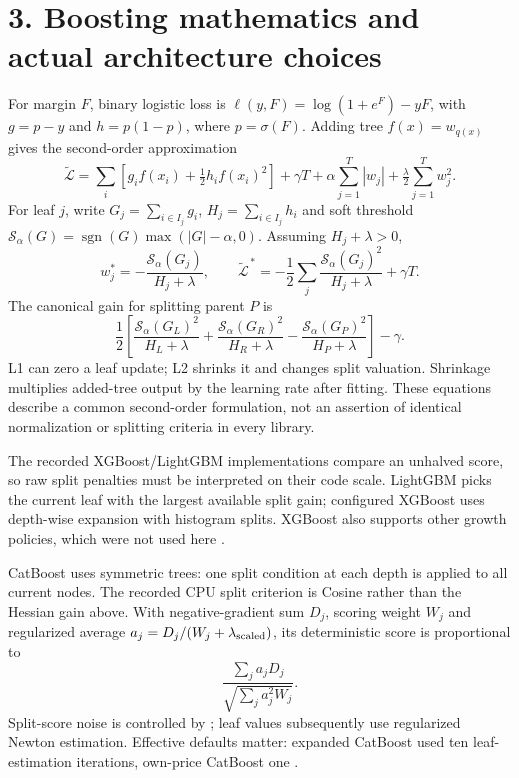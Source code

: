 \documentclass[11pt,a4paper]{article}
\begin{document}
\section*{3. Boosting mathematics and actual architecture choices}
For margin $F$, binary logistic loss is $\ell(y,F)=\log(1+e^F)-yF$, with $g=p-y$ and $h=p(1-p)$, where $p=\sigma(F)$. Adding tree $f(x)=w_{q(x)}$ gives the second-order approximation
\[
\widetilde{\mathcal L}=\sum_i[g_i f(x_i)+\tfrac12h_i f(x_i)^2]
+\gamma T+\alpha\sum_{j=1}^T|w_j|+\tfrac\lambda2\sum_{j=1}^T w_j^2.
\]
For leaf $j$, write $G_j=\sum_{i\in I_j}g_i$, $H_j=\sum_{i\in I_j}h_i$ and soft threshold $\mathcal S_\alpha(G)=\operatorname{sgn}(G)\max(|G|-\alpha,0)$. Assuming $H_j+\lambda>0$,
\[
w_j^*=-\frac{\mathcal S_\alpha(G_j)}{H_j+\lambda},\qquad
\widetilde{\mathcal L}^{\,*}=-\frac12\sum_j
\frac{\mathcal S_\alpha(G_j)^2}{H_j+\lambda}+\gamma T.
\]
The canonical gain for splitting parent $P$ is
\[
\frac12\left[
\frac{\mathcal S_\alpha(G_L)^2}{H_L+\lambda}
+\frac{\mathcal S_\alpha(G_R)^2}{H_R+\lambda}
-\frac{\mathcal S_\alpha(G_P)^2}{H_P+\lambda}\right]-\gamma.
\]
L1 can zero a leaf update; L2 shrinks it and changes split valuation. Shrinkage multiplies added-tree output by the learning rate after fitting. These equations describe a common second-order formulation, not an assertion of identical normalization or splitting criteria in every library.

The recorded XGBoost/LightGBM implementations compare an unhalved score, so raw split penalties must be interpreted on their code scale. LightGBM picks the current leaf with the largest available split gain; configured XGBoost uses depth-wise expansion with histogram splits. XGBoost also supports other growth policies, which were not used here \cite{lightgbm470_source,xgboost_source}.

CatBoost uses symmetric trees: one split condition at each depth is applied to all current nodes. The recorded CPU split criterion is Cosine rather than the Hessian gain above. With negative-gradient sum $D_j$, scoring weight $W_j$ and regularized average $a_j=D_j/(W_j+\lambda_{\rm scaled})$, its deterministic score is proportional to
\[
\frac{\sum_j a_jD_j}{\sqrt{\sum_j a_j^2W_j}}.
\]
Split-score noise is controlled by ; leaf values subsequently use regularized Newton estimation. Effective defaults matter: expanded CatBoost used ten leaf-estimation iterations, own-price CatBoost one \cite{catboost_source,catboost_params}.
\end{document}

